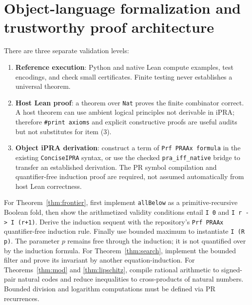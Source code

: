 \documentclass[11pt]{article}
\begin{document}
\section{Object-language formalization and trustworthy proof architecture}
There are three separate validation levels:
\begin{enumerate}[label=(\arabic*)]
\item \textbf{Reference execution}: Python and native Lean compute examples, test encodings, and check small certificates. Finite testing never establishes a universal theorem.
\item \textbf{Host Lean proof}: a theorem over \texttt{Nat} proves the finite combinator correct. A host theorem can use ambient logical principles not derivable in iPRA; therefore \texttt{\#print axioms} and explicit constructive proofs are useful audits but not substitutes for item (3).
\item \textbf{Object iPRA derivation}: construct a term of \texttt{Prf PRAAx formula} in the existing \texttt{ConciseIPRA} syntax, or use the checked \texttt{pra\_iff\_native} bridge to transfer an established derivation. The PR symbol compilation and quantifier-free induction proof are required, not assumed automatically from host Lean correctness.
\end{enumerate}
For Theorem~\ref{thm:frontier}, first implement \texttt{allBelow} as a primitive-recursive Boolean fold, then show the arithmetized validity conditions entail \texttt{I 0} and \texttt{I r -> I (r+1)}. Derive the induction sequent with the repository's \texttt{Prf PRAAx} quantifier-free induction rule. Finally use bounded maximum to instantiate \texttt{I (R p)}. The parameter \(p\) remains free through the induction; it is not quantified over by the induction formula. For Theorem~\ref{thm:search}, implement the bounded filter and prove its invariant by another equation-induction. For Theorems~\ref{thm:mod} and \ref{thm:lipschitz}, compile rational arithmetic to signed-pair natural codes and reduce inequalities to cross-products of natural numbers. Bounded division and logarithm computations must be defined via PR recurrences.
\end{document}
